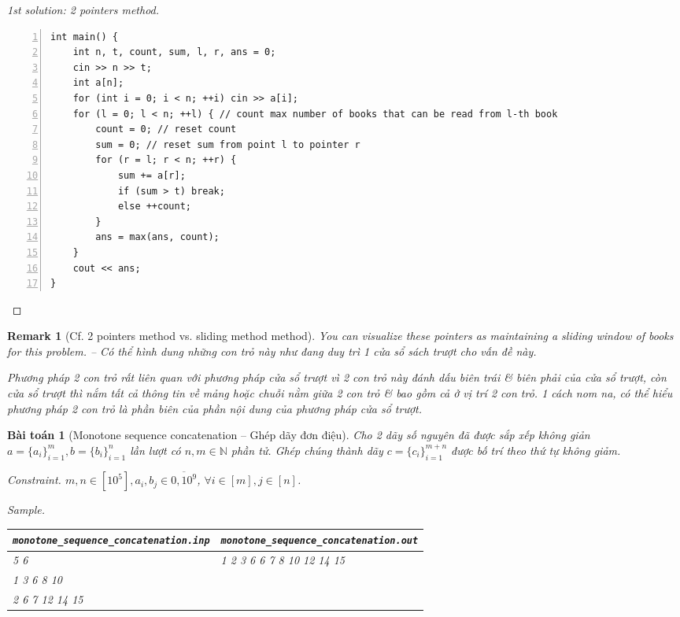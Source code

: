 \documentclass{article}
\newtheorem{baitoan}{Bài toán}
\newtheorem{remark}{Remark}
\begin{document}
\begin{proof}[1st solution: 2 pointers method]
\begin{enumerate}
\begin{Verbatim}[numbers=left,xleftmargin=5mm]
int main() {
    int n, t, count, sum, l, r, ans = 0;
    cin >> n >> t;
    int a[n];
    for (int i = 0; i < n; ++i) cin >> a[i];
    for (l = 0; l < n; ++l) { // count max number of books that can be read from l-th book
        count = 0; // reset count
        sum = 0; // reset sum from point l to pointer r
        for (r = l; r < n; ++r) {
            sum += a[r];
            if (sum > t) break;
            else ++count;
        }
        ans = max(ans, count);
    }
    cout << ans;
}
        \end{Verbatim}
    \end{enumerate}
\end{proof}

\begin{remark}[Cf. 2 pointers method vs. sliding method method]
    You can visualize these pointers as maintaining a sliding window of books for this problem. -- Có thể hình dung những con trỏ này như đang duy trì 1 cửa sổ sách trượt cho vấn đề này.

    Phương pháp 2 con trỏ rất liên quan với phương pháp cửa sổ trượt vì 2 con trỏ này đánh dấu biên trái \& biên phải của cửa sổ trượt, còn cửa sổ trượt thì nắm tất cả thông tin về mảng hoặc chuỗi nằm giữa 2 con trỏ \& bao gồm cả ở vị trí 2 con trỏ. 1 cách nom na, có thể hiểu phương pháp 2 con trỏ là phần biên của phần nội dung của phương pháp cửa sổ trượt.
\end{remark}

\begin{baitoan}[Monotone sequence concatenation -- Ghép dãy đơn điệu]
    Cho 2 dãy số nguyên đã được sắp xếp không giản $a = \{a_i\}_{i=1}^m,b = \{b_i\}_{i=1}^n$ lần lượt có $n,m\in\mathbb{N}$ phần tử. Ghép chúng thành dãy $c = \{c_i\}_{i=1}^{m+n}$ được bố trí theo thứ tự không giảm.
    \item {\sf Constraint.} $m,n\in[10^5],a_i,b_j\in\overline{0,10^9}$, $\forall i\in[m],j\in[n]$.
    \item {\sf Sample.}
    \begin{table}[H]
        \centering
        \begin{tabular}{|l|l|}
            \hline
            \verb|monotone_sequence_concatenation.inp| & \verb|monotone_sequence_concatenation.out| \\
            \hline
            5 6 & 1 2 3 6 6 7 8 10 12 14 15 \\
            1 3 6 8 10 & \\
            2 6 7 12 14 15 & \\
            \hline
        \end{tabular}
    \end{table}
\end{baitoan}
\end{document}
